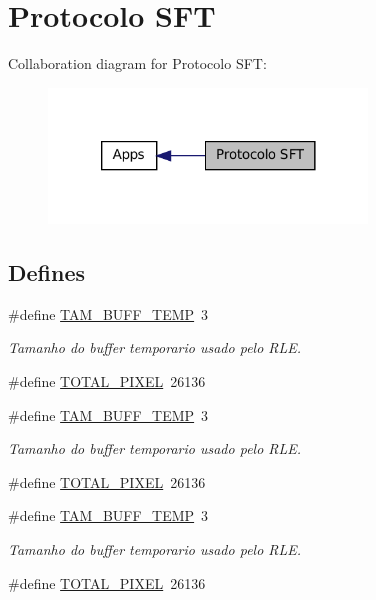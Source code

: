 \hypertarget{group__SFTD}{
\section{Protocolo SFT}
\label{group__SFTD}
}


Collaboration diagram for Protocolo SFT:
\nopagebreak
\begin{figure}[H]
\begin{center}
\leavevmode
\includegraphics[width=240pt]{group__SFTD}
\end{center}
\end{figure}


\subsection*{Defines}
\begin{DoxyCompactItemize}
\item 
\#define \hyperlink{group__SFTD_gaa5186a00142139694fa51998303b63a0}{TAM\_\-BUFF\_\-TEMP}~3
\begin{DoxyCompactList}\small\item\em Tamanho do buffer temporario usado pelo RLE. \item\end{DoxyCompactList}\item 
\#define \hyperlink{group__SFTD_ga3607c9823abc40aef55f22aa45a16438}{TOTAL\_\-PIXEL}~26136
\item 
\#define \hyperlink{group__SFTD_gaa5186a00142139694fa51998303b63a0}{TAM\_\-BUFF\_\-TEMP}~3
\begin{DoxyCompactList}\small\item\em Tamanho do buffer temporario usado pelo RLE. \item\end{DoxyCompactList}\item 
\#define \hyperlink{group__SFTD_ga3607c9823abc40aef55f22aa45a16438}{TOTAL\_\-PIXEL}~26136
\item 
\#define \hyperlink{group__SFTD_gaa5186a00142139694fa51998303b63a0}{TAM\_\-BUFF\_\-TEMP}~3
\begin{DoxyCompactList}\small\item\em Tamanho do buffer temporario usado pelo RLE. \item\end{DoxyCompactList}\item 
\#define \hyperlink{group__SFTD_ga3607c9823abc40aef55f22aa45a16438}{TOTAL\_\-PIXEL}~26136
\end{DoxyCompactItemize}
